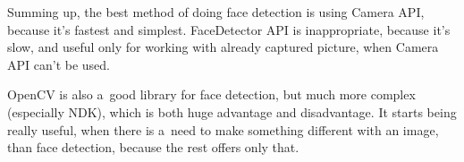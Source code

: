 Summing up, the best method of doing face detection is using Camera API, because
it's fastest and simplest.
FaceDetector API is inappropriate, because it's slow, and useful only for
working with already captured picture, when Camera API can't be used.

OpenCV is also a~good library for face detection, but much more complex
(especially NDK), which is both huge advantage and disadvantage.
It starts being really useful, when there is a~need to make something different
with an image, than face detection, because the rest offers only that.
